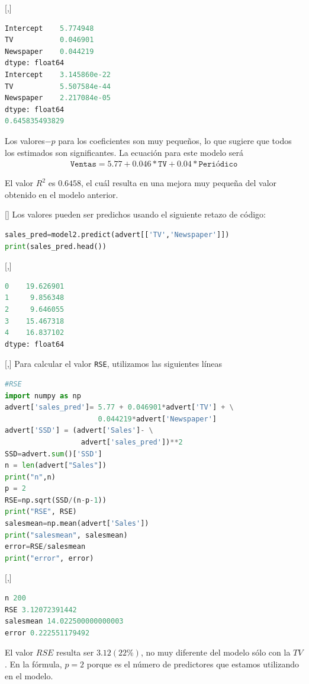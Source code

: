 [,]{}
\begin{lstlisting}[language=Python]
Intercept    5.774948
TV           0.046901
Newspaper    0.044219
dtype: float64
Intercept    3.145860e-22
TV           5.507584e-44
Newspaper    2.217084e-05
dtype: float64
0.645835493829
\end{lstlisting}


Los valores$-p$ para los coeficientes son muy pequeños, lo que sugiere que todos los estimados son significantes.  La ecuación para este modelo será
\begin{align}
 \texttt{Ventas} = 5.77 + 0.046*\texttt{TV} + 0.04*\texttt{Periódico}
\end{align}


El valor $R^{2}$ es $0.6458$, el cuál resulta en una mejora muy pequeña del valor obtenido en el modelo anterior.

[]{}
Los valores pueden ser predichos usando el siguiente retazo de código:
\begin{lstlisting}[language=Python]
sales_pred=model2.predict(advert[['TV','Newspaper']])
print(sales_pred.head())
\end{lstlisting}

[,]{}
\begin{lstlisting}[language=Python]
0    19.626901
1     9.856348
2     9.646055
3    15.467318
4    16.837102
dtype: float64
\end{lstlisting}

[,]{}
Para calcular el valor \texttt{RSE}, utilizamos las siguientes líneas
\begin{lstlisting}[language=Python]
#RSE
import numpy as np
advert['sales_pred']= 5.77 + 0.046901*advert['TV'] + \
                      0.044219*advert['Newspaper']
advert['SSD'] = (advert['Sales']- \
                  advert['sales_pred'])**2
SSD=advert.sum()['SSD']
n = len(advert["Sales"])
print("n",n)
p = 2
RSE=np.sqrt(SSD/(n-p-1))
print("RSE", RSE)
salesmean=np.mean(advert['Sales'])
print("salesmean", salesmean)
error=RSE/salesmean
print("error", error)
\end{lstlisting}

[,]{}
\begin{lstlisting}[language=Python]
n 200
RSE 3.12072391442
salesmean 14.022500000000003
error 0.222551179492
\end{lstlisting}


El valor $RSE$ resulta ser $3.12 (22\%)$, no muy diferente del modelo sólo con la $TV$. En la fórmula, $p=2$ porque es el número de predictores que estamos utilizando en el modelo.

